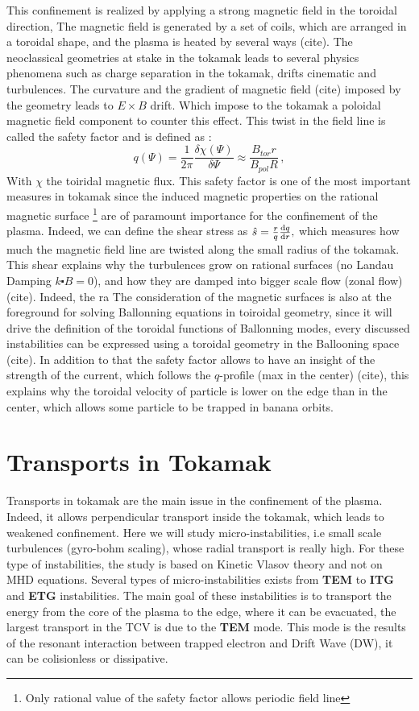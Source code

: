 \documentclass[11pt,a4paper]{report}
\begin{document}
\begin{multicols}{2}
    This confinement is realized by applying a strong magnetic field in the toroidal direction, The magnetic field is generated by a set of coils, which are arranged in a toroidal shape, and the plasma is heated by several ways (cite). The neoclassical geometries at stake in the tokamak leads to several physics phenomena such as charge separation in the tokamak, drifts cinematic and turbulences. The curvature and the gradient of magnetic field (cite) imposed by the geometry leads to $E \times B$ drift. Which impose to the tokamak a poloidal magnetic field component to counter this effect. This twist in the field line is called the safety factor and is defined as :
    $$q(\Psi) = \frac{1}{2\pi}\frac{\delta \chi (\Psi)}{\delta \Psi} \approx \frac{B_{tor}r}{B_{pol}R} \, ,$$
    With $\chi$ the toiridal magnetic flux. This safety factor is one of the most important measures in tokamak since the induced magnetic properties on the rational magnetic surface \footnote{Only rational value of the safety factor allows periodic field line} are of paramount importance for the confinement of the plasma. Indeed, we can define the shear stress as $\hat{s} = \frac{r}{q}\dv{q}{r},$ which measures how much the magnetic field line are twisted along the small radius of the tokamak. This shear explains why the turbulences grow on rational surfaces (no Landau Damping $k \centerdot B = 0$), and how they are damped into bigger scale flow (zonal flow) (cite).
    Indeed, the ra The consideration of the magnetic surfaces is also at the foreground for solving Ballonning equations in toiroidal geometry, since it will drive the definition of the toroidal functions of Ballonning modes, every discussed instabilities can be expressed using a toroidal geometry in the Ballooning space (cite). In addition to that the safety factor allows to have an insight of the strength of the current, which follows the $q$-profile (max in the center) (cite), this explains why the toroidal velocity of particle is lower on the edge than in the center, which allows some particle to be trapped in banana orbits.


    \section{Transports in Tokamak}
    Transports in tokamak are the main issue in the confinement of the plasma. Indeed, it allows perpendicular transport inside the tokamak, which leads to weakened confinement. Here we will study micro-instabilities, i.e small scale turbulences (gyro-bohm scaling), whose radial transport is really high. For these type of instabilities, the study is based on Kinetic Vlasov theory and not on MHD equations.
    Several types of micro-instabilities exists from \textbf{TEM} to \textbf{ITG} and \textbf{ETG} instabilities. The main goal of these instabilities is to transport the energy from the core of the plasma to the edge, where it can be evacuated, the largest transport in the TCV is due to the \textbf{TEM} mode. This mode is the results of the resonant interaction between trapped electron and Drift Wave (DW), it can be colisionless or dissipative.

\end{multicols}
\end{document}
